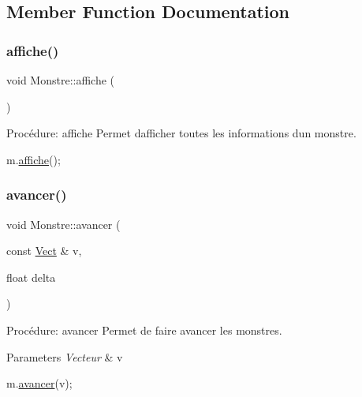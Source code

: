 \subsection{Member Function Documentation}
\mbox{\label{classMonstre_ac6700482d005ec983746983f76ad0088}} 
\subsubsection{\texorpdfstring{affiche()}{affiche()}}
{\footnotesize\ttfamily void Monstre\+::affiche (\begin{DoxyParamCaption}{ }\end{DoxyParamCaption})}



Procédure\+: affiche Permet d\textquotesingle{}afficher toutes les informations d\textquotesingle{}un monstre. 


\begin{DoxyCode}
m.\hyperlink{classMonstre_ac6700482d005ec983746983f76ad0088}{affiche}();
\end{DoxyCode}
 \mbox{\label{classMonstre_a5fed7574a7a621251d313219c0831b09}} 
\subsubsection{\texorpdfstring{avancer()}{avancer()}}
{\footnotesize\ttfamily void Monstre\+::avancer (\begin{DoxyParamCaption}\item[{const \hyperlink{classVect}{Vect} \&}]{v,  }\item[{float}]{delta }\end{DoxyParamCaption})}



Procédure\+: avancer Permet de faire avancer les monstres. 


\begin{DoxyParams}{Parameters}
{\em Vecteur} & v 
\begin{DoxyCode}
m.\hyperlink{classMonstre_a5fed7574a7a621251d313219c0831b09}{avancer}(v);
\end{DoxyCode}
 \\
\hline
\end{DoxyParams}
\mbox{\label{classMonstre_aebc60bc5dfa1353663ba975c589dc2e3}} 
